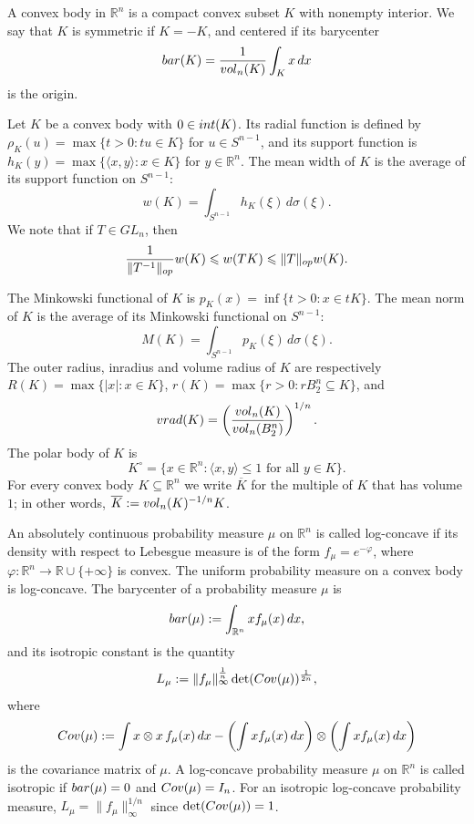 \documentclass[10pt,a4paper]{amsart}
\numberwithin{equation}{section}
\newcommand{\ls}{\leqslant}
\begin{document}
\medskip

A {convex body} in $\mathbb{R}^n$ is a compact convex subset $K$ with nonempty interior.  
We say that $K$ is {symmetric} if $K = -K$, and {centered} if its barycenter
\[{\rm bar}(K)=\frac{1}{{\rm vol}_n(K)}\int_K x\,dx\] is the origin.

Let $K$ be a convex body with $0 \in {\rm int}(K)$. Its radial function is defined by 
$\rho_K(u) = \max\{ t > 0 : tu \in K \}$ for $u \in S^{n-1}$, 
and its {support function} is
$h_K(y) = \max \{ \langle x, y \rangle : x \in K \}$ for $y\in\mathbb{R}^n$. The mean width of $K$ is the average of its support function on $S^{n-1}$:
\[w(K)=\int_{S^{n-1}}h_K(\xi)\,d\sigma(\xi).\]
We note that if $T \in GL_n$, then
\[\frac{1}{\|T^{-1}\|_{{\rm op}}} w(K) \ls w(TK) \ls \|T\|_{{\rm op}} w(K).\]

The Minkowski functional of $K$ is $p_K(x) = \inf\{ t > 0 : x \in tK \}$. The mean norm of $K$ is the average of its Minkowski functional on $S^{n-1}$:
\[M(K)=\int_{S^{n-1}}p_K(\xi)\,d\sigma(\xi).\]
The outer radius, inradius and volume radius of $K$ are respectively $R(K) = \max\{ |x| : x \in K \}$, $r(K)=\max\{r>0:rB_2^n\subseteq K\}$,
and
\[{\rm vrad}(K) = \left( \frac{{\rm vol}_n(K)}{{\rm vol}_n(B_2^n)} \right)^{1/n}.\]
The {polar body} of $K$ is
\[K^{\circ} = \{ x \in \mathbb{R}^n : \langle x, y \rangle \ls 1 \text{ for all } y \in K \}.\]
For every convex body $K\subseteq \mathbb{R}^n$ we write $\overline{K}$ for the multiple of $K$ that has
volume $1$; in other words, $\overline{K}:={\rm vol}_n(K)^{-1/n}K$.

\medskip
An absolutely continuous probability measure $\mu$ on $\mathbb{R}^n$ is called {log-concave} if its density with respect
to Lebesgue measure is of the form
$f_\mu = e^{-\varphi}$, where $\varphi : \mathbb{R}^n \to \mathbb{R} \cup \{+\infty\}$ is convex.  
The uniform probability measure on a convex body is log-concave. The barycenter of a probability measure $\mu$ is
\[{\rm bar}(\mu) := \int_{\mathbb{R}^n} x f_\mu(x) \, dx,\]
and its {isotropic constant} is the quantity
\begin{equation*}L_\mu := \|f_\mu\|_{\infty}^{\frac{1}{n}}\det({\rm Cov}(\mu))^{\frac{1}{2n}},\end{equation*}
where
\[{\rm Cov}(\mu) := \int x \otimes x \,f_{\mu}(x)\, dx- \left( \int xf_{\mu}(x) \, dx \right) \otimes \left( \int xf_{\mu}(x) \, dx \right)\]
is the covariance matrix of $\mu$.  
A log-concave probability measure $\mu$ on $\mathbb{R}^n$ is called {isotropic} if ${\rm bar}(\mu) = 0$ and ${\rm Cov}(\mu) = I_n$. For an isotropic
log-concave probability measure, $L_{\mu}=\|f_{\mu}\|_{\infty}^{1/n}$ since $\det({\rm Cov}(\mu))=1$. 
\medskip
\end{document}
